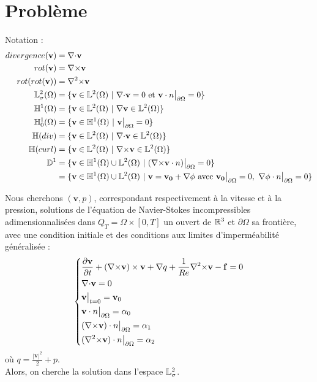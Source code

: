 \section{Problème}
Notation :
\begin{align*}
divergence(\mathbf{v})&=\diverg \mathbf{v}\\
rot(\mathbf{v})&=\rot \mathbf{v}\\
rot(rot(\mathbf{v}))&=\rott \mathbf{v}\\
\LL^2_\sigma(\Omega) &= \{\mathbf{v} \in \LL^2(\Omega)\ |\ \diverg \mathbf{v} = 0\text{ et }\mathbf{v}\cdot n\restr = 0 \}\\
\HH^1(\Omega) &= \{\mathbf{v} \in \LL^2(\Omega)\ |\ \grad \mathbf{v}\in\LL^2(\Omega)\}\\
\HH^1_0(\Omega) &= \{\mathbf{v} \in \HH^1(\Omega)\ |\ \mathbf{v}\restr = 0\}\\
\HH(div) &= \{\mathbf{v} \in \LL^2(\Omega)\ |\ \diverg\mathbf{v} \in \LL^2(\Omega) \}\\
\HH(curl) &= \{\mathbf{v} \in \LL^2(\Omega)\ |\ \rot\mathbf{v} \in \LL^2(\Omega) \}\\
\DD^1 &= \{\mathbf{v} \in \HH^1(\Omega)\cup \LL^2(\Omega)\ |\ (\rot \mathbf{v}\cdot n)\restr = 0  \}\\
&=\{\mathbf{v} \in \HH^1(\Omega)\cup \LL^2(\Omega)\ |\ \mathbf{v}=\mathbf{v_0}+\grad\phi \text{ avec } \mathbf{v_0}\restr = 0,\ \grad\phi\cdot n\restr = 0 \}
\end{align*}

Nous cherchons $(\mathbf{v},p)$, correspondant respectivement à la vitesse et à la pression, solutions de l'équation de Navier-Stokes incompressibles adimensionnalisées dans $Q_T=\Omega\times[0,T]$ un ouvert de ${\mathbb{R}}^3$ et $\partial\Omega$ sa frontière, avec une condition initiale et des conditions aux limites d'imperméabilité généralisée :
\begin{equation}
\label{depart}
\left\{
\begin{aligned}
&\frac{\partial \mathbf{v}}{\partial t} + ({\nabla\times}  \mathbf{v})\times \mathbf{v} + {\nabla} q + \frac{1}{Re}{\nabla^2\times}  \mathbf{v}-\mathbf{f} = 0\\
&{\nabla\cdot} \mathbf{v} = 0\\
&\mathbf{v}\big\rvert_{t=0} = \mathbf{v}_0\\
&\mathbf{v}\cdot n{\big\rvert_{\partial\Omega}} = \alpha_0\\
&({\nabla\times}  \mathbf{v})\cdot n{\big\rvert_{\partial\Omega}} = \alpha_1\\
&({\nabla^2\times}  \mathbf{v})\cdot n{\big\rvert_{\partial\Omega}} = \alpha_2
\end{aligned}
\right.
\end{equation}
où $q = \frac{|\mathbf{v}|^2}{2}+p$.\\
Alors, on cherche la solution dans l'espace ${\mathbb{L}}^2_\sigma$.\\

